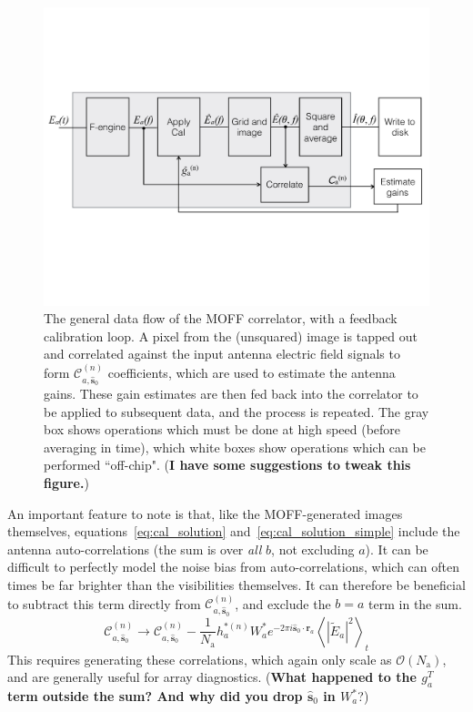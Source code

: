 \documentclass[a4paper,fleqn,usenatbib]{../mnras}
\newcommand{\Nant}{\ensuremath{N_{\mathrm{a}}}}
\newcommand{\spix}{\ensuremath{\hat{\mathbf{s}}_{0}}}
\newcommand{\Cna}[1][n]{\ensuremath{\mathcal{C}^{(#1)}_{a,\spix}}}
\newcommand{\ra}{\ensuremath{\mathbf{r}_a}}
\newcommand{\beamtheta}{\ensuremath{W}}
\newcommand{\Er}[1]{\ensuremath{\widetilde{E}_{#1}}}
\begin{document}
\begin{figure}
\begin{center}
\includegraphics[width=\columnwidth]{figures/schematic.pdf}
\caption{The general data flow of the MOFF correlator, with a feedback calibration loop. A pixel from the (unsquared) image is tapped out and correlated against the input antenna electric field signals to form $\Cna$ coefficients, which are used to estimate the antenna gains. These gain estimates are then fed back into the correlator to be applied to subsequent data, and the process is repeated. The gray box shows operations which must be done at high speed (before averaging in time), which white boxes show operations which can be performed ``off-chip". ({\bf I have some suggestions to tweak this figure.})}
\label{fig:schematic}
\end{center}
\end{figure}

An important feature to note is that, like the MOFF-generated images themselves, equations~\ref{eq:cal_solution} and~\ref{eq:cal_solution_simple} include the antenna auto-correlations (the sum is over \emph{all} $b$, not excluding $a$). It can be difficult to perfectly model the noise bias from auto-correlations, which can often times be far brighter than the visibilities themselves. It can therefore be beneficial to subtract this term directly from \Cna, and exclude the $b=a$ term in the sum.
\begin{equation}
\Cna \rightarrow \Cna - \frac{1}{\Nant} h^{*(n)}_a\beamtheta^*_a e^{-2\pi i \spix \cdot \ra} \left<|\Er{a}|^2\right>_t
\end{equation}
This requires generating these correlations, which again only scale as $\mathcal{O}(\Nant)$, and are generally useful for array diagnostics. ({\bf What happened to the $g_a^T$ term outside the sum? And why did you drop $\hat{\mathbf{s}}_0$ in $W_a^*$}?)
\end{document}
